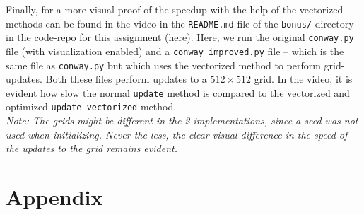 \documentclass[a4paper,12pt]{article}
\begin{document}
Finally, for a more visual proof of the speedup with the help of the vectorized methods can be found in the video in the \verb|README.md| file of the \verb|bonus/| directory in the code-repo for this assignment (\href{https://github.com/paulmyr/DD2358-HPC25/blob/master/02_hpcds/bonus/README.md}{here}). Here, we run the original \verb|conway.py| file (with visualization enabled) and a \verb|conway_improved.py| file -- which is the same file as \verb|conway.py| but which uses the vectorized method to perform grid-updates. Both these files perform updates to a $512 \times 512$ grid. In the video, it is evident how slow the normal \verb|update| method is compared to the vectorized and optimized \verb|update_vectorized| method. \\
\textit{Note: The grids might be different in the 2 implementations, since a seed was not used when initializing. Never-the-less, the clear visual difference in the speed of the updates to the grid remains evident.}
\section{Appendix}


\end{document}
